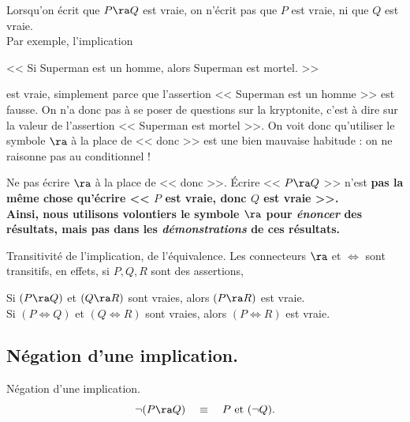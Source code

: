 \documentclass[11pt]{article}
\begin{document}
\warning Lorsqu'on écrit que $P\ra Q$ est vraie, on n'écrit pas que $P$ est vraie, ni que $Q$ est vraie.\\
Par exemple, l'implication
\begin{center}
    << Si Superman est un homme, alors Superman est mortel. >>
\end{center}
est vraie, simplement parce que l'assertion << Superman est un homme >> est fausse. On n'a donc pas à se poser de questions sur la kryptonite, c'est à dire sur la valeur de l'assertion << Superman est mortel >>.\n
On voit donc qu'utiliser le symbole $\ra$ à la place de << donc >> est une bien mauvaise habitude : on ne raisonne pas au conditionnel !
\vspace*{0.3cm}

\begin{meth}{Ne pas écrire $\ra$ à la place de << donc >>.}{}
    Écrire << $P \ra Q$ >> n'est \bf{pas la même chose} qu'écrire << $P$ est vraie, donc $Q$ est vraie >>.\\
    Ainsi, nous utilisons volontiers le symbole $\ra$ pour \emph{énoncer} des résultats, mais pas dans les \emph{démonstrations} de ces résultats.
\end{meth}

\vspace*{-0.8cm}

\begin{prop}{Transitivité de l'implication, de l'équivalence.}{}
    Les connecteurs $\ra$ et $\iff$ sont transitifs, en effets, si $P,Q,R$ sont des assertions,
    \begin{center}
        Si $(P \ra Q)$ et $(Q \ra R)$ sont vraies, alors $(P\ra R)$ est vraie.\\
        Si $(P \iff Q)$ et $(Q \iff R)$ sont vraies, alors $(P \iff R)$ est vraie.
    \end{center}
\end{prop}

\vspace*{-0.8cm}

\subsection{Négation d'une implication.}

\begin{prop}{Négation d'une implication.}{}
    \begin{equation*}
        \lnot (P \ra Q) \quad \equiv \quad P \text{ et } (\lnot Q).
    \end{equation*}
\end{prop}
\end{document}
